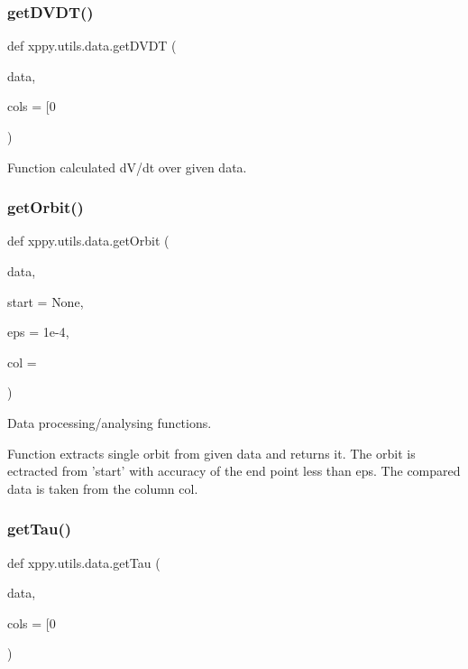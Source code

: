 \subsubsection{\texorpdfstring{get\+D\+V\+D\+T()}{getDVDT()}}
{\footnotesize\ttfamily def xppy.\+utils.\+data.\+get\+D\+V\+DT (\begin{DoxyParamCaption}\item[{}]{data,  }\item[{}]{cols = {\ttfamily \mbox{[}0} }\end{DoxyParamCaption})}

\begin{DoxyVerb}Function calculated dV/dt over given data.
\end{DoxyVerb}
 \mbox{\label{namespacexppy_1_1utils_1_1data_a5b590b344df5f227497a0be2c46d7182}} 
\subsubsection{\texorpdfstring{get\+Orbit()}{getOrbit()}}
{\footnotesize\ttfamily def xppy.\+utils.\+data.\+get\+Orbit (\begin{DoxyParamCaption}\item[{}]{data,  }\item[{}]{start = {\ttfamily None},  }\item[{}]{eps = {\ttfamily 1e-\/4},  }\item[{}]{col = {} }\end{DoxyParamCaption})}



Data processing/analysing functions. 

\begin{DoxyVerb}Function extracts single orbit from given data and returns it.
The orbit is ectracted from 'start' with accuracy of the end 
point less than eps. The compared data is taken from 
the column col.
\end{DoxyVerb}
 \mbox{\label{namespacexppy_1_1utils_1_1data_a3bace94f47f9cadb95abf59e90a272dd}} 
\subsubsection{\texorpdfstring{get\+Tau()}{getTau()}}
{\footnotesize\ttfamily def xppy.\+utils.\+data.\+get\+Tau (\begin{DoxyParamCaption}\item[{}]{data,  }\item[{}]{cols = {\ttfamily \mbox{[}0} }\end{DoxyParamCaption})}

